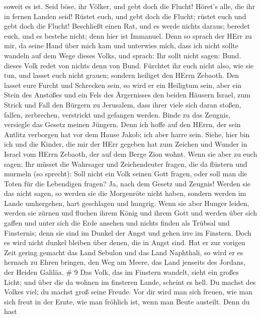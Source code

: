 soweit es ist.  Seid böse, ihr Völker, und gebt doch die
Flucht! Höret's alle, die ihr in fernen Landen seid! Rüstet euch, und
gebt doch die Flucht; rüstet euch und gebt doch die Flucht!
 Beschließt einen Rat, und es werde nichts daraus; beredet
euch, und es bestehe nicht; denn hier ist Immanuel.  Denn
so sprach der HErr zu mir, da seine Hand über mich kam und unterwies
mich, dass ich nicht sollte wandeln auf dem Wege dieses Volks, und
sprach:  Ihr sollt nicht sagen: Bund. dieses Volk redet von
nichts denn von Bund. Fürchtet ihr euch nicht also, wie sie tun, und
lasset euch nicht grauen;  sondern heiliget den HErrn
Zebaoth. Den lasset eure Furcht und Schrecken sein,  so
wird er ein Heiligtum sein, aber ein Stein des Anstoßes und ein Fels des
Ärgernisses den beiden Häusern Israel, zum Strick und Fall den Bürgern
zu Jerusalem,  dass ihrer viele sich daran stoßen, fallen,
zerbrechen, verstrickt und gefangen werden.  Binde zu das
Zeugnis, versiegle das Gesetz meinen Jüngern.  Denn ich
hoffe auf den HErrn, der sein Antlitz verborgen hat vor dem Hause Jakob;
ich aber harre sein.  Siehe, hier bin ich und die Kinder,
die mir der HErr gegeben hat zum Zeichen und Wunder in Israel vom HErrn
Zebaoth, der auf dem Berge Zion wohnt.  Wenn sie aber zu
euch sagen: Ihr müsset die Wahrsager und Zeichendeuter fragen, die da
flüstern und murmeln (so sprecht): Soll nicht ein Volk seinen Gott
fragen, oder soll man die Toten für die Lebendigen fragen? 
Ja, nach dem Gesetz und Zeugnis! Werden sie das nicht sagen, so werden
sie die Morgenröte nicht haben,  sondern werden im Lande
umhergehen, hart geschlagen und hungrig. Wenn sie aber Hunger leiden,
werden sie zürnen und fluchen ihrem König und ihrem Gott 
und werden über sich gaffen und unter sich die Erde ansehen und nichts
finden als Trübsal und Finsternis; denn sie sind im Dunkel der Angst und
gehen irre im Finstern.  Doch es wird nicht dunkel bleiben
über denen, die in Angst sind. Hat er zur vorigen Zeit gering gemacht
das Land Sebulon und das Land Naphthali, so wird er es hernach zu Ehren
bringen, den Weg am Meere, das Land jenseits des Jordans, der Heiden
Galiläa. \# 9  Das Volk, das im Finstern wandelt, sieht ein
großes Licht; und über die da wohnen im finsteren Lande, scheint es
hell.  Du machst des Volkes viel; du machst groß seine
Freude. Vor dir wird man sich freuen, wie man sich freut in der Ernte,
wie man fröhlich ist, wenn man Beute austeilt.  Denn du hast

